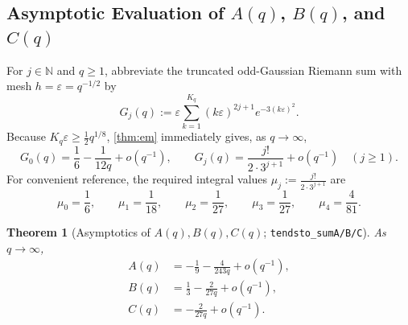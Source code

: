 \documentclass[11pt,a4paper]{article}
\numberwithin{equation}{section}
\theoremstyle{plain}
\newtheorem{theorem}{Theorem}[section]
\theoremstyle{definition}
\theoremstyle{remark}
\newcommand{\N}{\mathbb{N}}
\newcommand{\code}[1]{\texttt{\small #1}}
\begin{document}
\subsection{Asymptotic Evaluation of \texorpdfstring{$A(q)$, $B(q)$, and $C(q)$}{A(q), B(q), and C(q)}}

For $j\in\N$ and $q\ge 1$, abbreviate the truncated odd-Gaussian Riemann sum with mesh $h=\varepsilon=q^{-1/2}$ by
\begin{equation}\label{eq:Gsum-def}
  G_j(q) := \varepsilon\sum_{k=1}^{K_q} (k\varepsilon)^{2j+1}e^{-3(k\varepsilon)^2}.
\end{equation}
Because $K_q\varepsilon \ge \frac{1}{2}q^{1/8}$, \cref{thm:em} immediately gives, as $q\to\infty$,
\begin{equation}\label{eq:Gsum-limits}
  G_0(q) = \frac{1}{6} - \frac{1}{12q} + o(q^{-1}),
  \qquad
  G_j(q) = \frac{j!}{2\cdot 3^{j+1}} + o(q^{-1}) \quad (j\ge 1).
\end{equation}
For convenient reference, the required integral values $\mu_j := \frac{j!}{2\cdot 3^{j+1}}$ are
\[
  \mu_0 = \frac{1}{6},\qquad
  \mu_1 = \frac{1}{18},\qquad
  \mu_2 = \frac{1}{27},\qquad
  \mu_3 = \frac{1}{27},\qquad
  \mu_4 = \frac{4}{81}.
\]

\begin{theorem}[Asymptotics of $A(q),B(q),C(q)$; \code{tendsto\_sumA/B/C}]
\label{thm:abc-limits}
As $q\to\infty$,
\begin{align}
  A(q) &= -\frac{1}{9} - \frac{4}{243q} + o(q^{-1}), \label{eq:lim-A}\\
  B(q) &= \frac{1}{3} - \frac{2}{27q} + o(q^{-1}), \label{eq:lim-B}\\
  C(q) &= -\frac{2}{27q} + o(q^{-1}). \label{eq:lim-C}
\end{align}
\end{theorem}
\end{document}
